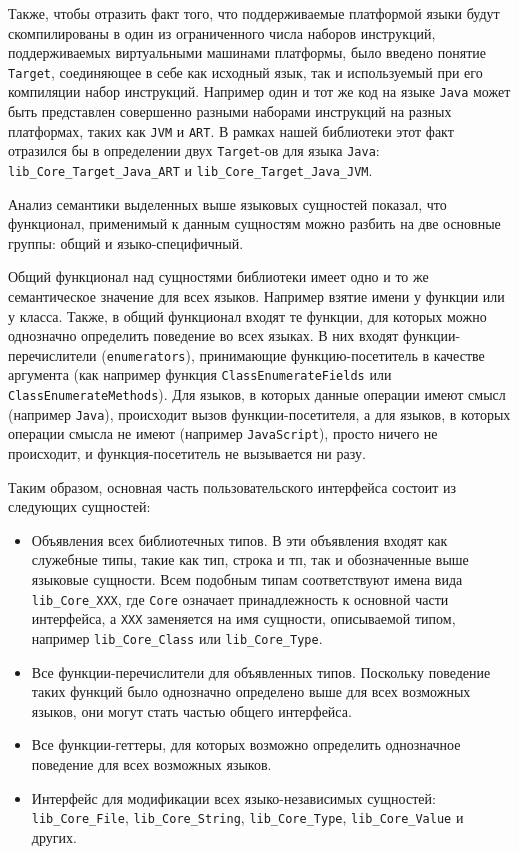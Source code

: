Также, чтобы отразить факт того, что поддерживаемые платформой языки будут скомпилированы в один из ограниченного числа наборов инструкций, поддерживаемых виртуальными машинами платформы, было введено понятие \texttt{Target}, соединяющее в себе как исходный язык, так и используемый при его компиляции набор инструкций. Например один и тот же код на языке \texttt{Java} может быть представлен совершенно разными наборами инструкций на разных платформах, таких как \texttt{JVM} и \texttt{ART}. В рамках нашей библиотеки этот факт отразился бы в определении двух \texttt{Target}-ов для языка \texttt{Java}: \texttt{lib\_Core\_Target\_Java\_ART} и \texttt{lib\_Core\_Target\_Java\_JVM}.

Анализ семантики выделенных выше языковых сущностей показал, что функционал, применимый к данным сущностям можно разбить на две основные группы: общий и языко-специфичный.

Общий функционал над сущностями библиотеки имеет одно и то же семантическое значение для всех языков. Например взятие имени у функции или у класса. Также, в общий функционал входят те функции, для которых можно однозначно определить поведение во всех языках. В них входят функции-перечислители (\texttt{enumerators}), принимающие функцию-посетитель в качестве аргумента (как например функция \texttt{ClassEnumerateFields} или \texttt{ClassEnumerateMethods}). Для языков, в которых данные операции имеют смысл (например \texttt{Java}), происходит вызов функции-посетителя, а для языков, в которых операции смысла не имеют (например \texttt{JavaScript}), просто ничего не происходит, и функция-посетитель не вызывается ни разу.

Таким образом, основная часть пользовательского интерфейса состоит из следующих сущностей:

\begin{itemize}
    \item Объявления всех библиотечных типов. В эти объявления входят как служебные типы, такие как тип, строка и тп, так и обозначенные выше языковые сущности. Всем подобным типам соответствуют имена вида \texttt{lib\_Core\_XXX}, где \texttt{Core} означает принадлежность к основной части интерфейса, а \texttt{XXX} заменяется на имя сущности, описываемой типом, например \texttt{lib\_Core\_Class} или \texttt{lib\_Core\_Type}.
    \item Все функции-перечислители для объявленных типов. Поскольку поведение таких функций было однозначно определено выше для всех возможных языков, они могут стать частью общего интерфейса.
    \item Все функции-геттеры, для которых возможно определить однозначное поведение для всех возможных языков.
    \item Интерфейс для модификации всех языко-независимых сущностей: \texttt{lib\_Core\_File}, \texttt{lib\_Core\_String}, \texttt{lib\_Core\_Type}, \texttt{lib\_Core\_Value} и других.
\end{itemize}

